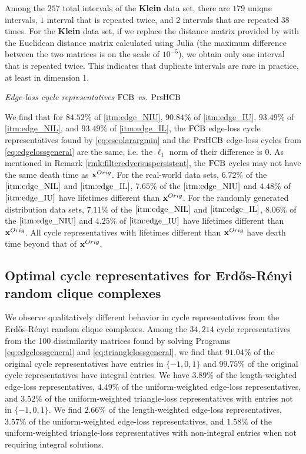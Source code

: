 Among the $257$ total intervals of the \textbf{Klein} data set, there are $179$ unique intervals, $1$ interval that is repeated twice, and $2$ intervals that are repeated $38$ times. For the \textbf{Klein} data set, if we replace the distance matrix provided by \cite{roadmap2017} with the Euclidean distance matrix calculated using Julia (the maximum difference between the two matrices is on the scale of $10^{-5}$), we obtain only one interval that is repeated twice. This indicates that duplicate intervals are rare in practice, at least in dimension 1. 


 \noindent \emph{Edge-loss cycle representatives $\mathrm{FCB}$ vs. $\mathrm{PrsHCB}$}

We find that for $84.52\%$ of \ref{itm:edge_NIU}, $90.84\%$ of \ref{itm:edge_IU}, $93.49\%$ of \ref{itm:edge_NIL}, and $93.49\%$ of \ref{itm:edge_IL}, the $\mathrm{FCB}$ edge-loss cycle representatives found by \pr \eqref{eq:escolarargmin} and the $\mathrm{PrsHCB}$ edge-loss cycles from \pr \eqref{eq:edgelossgeneral} are the same, i.e. the $\ell_1$ norm of their difference is $0$. As mentioned in Remark \ref{rmk:filteredversuspersistent}, the $\mathrm{FCB}$ cycles may not have the same death time as $\mathbf{x}^{Orig}$. For the real-world data sets, $6.72\%$ of the $\eqref{itm:edge_NIL}$ and $\eqref{itm:edge_IL}$,  $7.65\%$ of the $\eqref{itm:edge_NIU}$ and $4.48\%$ of $\eqref{itm:edge_IU}$ have lifetimes different than $\mathbf{x}^{Orig}$. For the randomly generated distribution data sets, $7.11\%$ of the $\eqref{itm:edge_NIL}$ and $\eqref{itm:edge_IL}$,  $8.06\%$ of the $\eqref{itm:edge_NIU}$ and $4.25\%$ of $\eqref{itm:edge_IU}$ have lifetimes different than $\mathbf{x}^{Orig}$. All cycle representatives with lifetimes different than $\mathbf{x}^{Orig}$ have death time beyond that of $\mathbf{x}^{Orig}$.



\subsection{Optimal cycle representatives for Erd\H{o}s-R\'enyi random clique complexes}
\label{sec:erdosbehavior}

We observe qualitatively different behavior in cycle representatives from the Erd\H{o}s-R\'enyi random clique complexes.
Among the $34{,}214$ cycle representatives from the 100 dissimilarity matrices found by solving Programs \eqref{eq:edgelossgeneral} and \eqref{eq:trianglelossgeneral}, we find that $91.04\%$ of the original cycle representatives have entries in $\{-1,0,1\}$ and $99.75\%$ of the original cycle representatives have integral entries. We have $3.89\%$ of the length-weighted edge-loss representatives, $4.49\%$ of the uniform-weighted edge-loss representatives, and $3.52\%$ of the uniform-weighted triangle-loss representatives with entries not in $\{-1,0,1\}$. We find $2.66\%$ of the length-weighted edge-loss representatives, $3.57\%$ of the uniform-weighted edge-loss representatives, and $1.58\%$ of the uniform-weighted triangle-loss representatives with non-integral entries when not requiring integral solutions.

